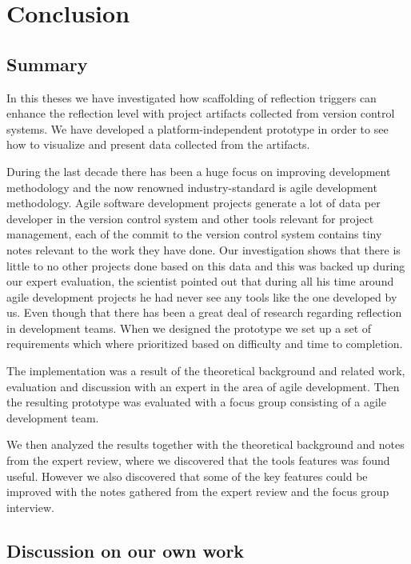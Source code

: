 \chapter{Conclusion}
 
\section{Summary}
In this theses we have investigated how scaffolding of reflection triggers can enhance the reflection level with project artifacts collected from version control systems. We have developed a platform-independent prototype in order to see how to visualize and present data collected from the artifacts.

During the last decade there has been a huge focus on improving development methodology and the now renowned industry-standard is agile development methodology. Agile software development projects generate a lot of data per developer in the version control system and other tools relevant for project management, each of the commit to the version control system contains tiny notes relevant to the work they have done. Our investigation shows that there is little to no other projects done based on this data and this was backed up during our expert evaluation, the scientist pointed out that during all his time around agile development projects he had never see any tools like the one developed by us. Even though that there has been a great deal of research regarding reflection in development teams. When we designed the prototype we set up a set of requirements which where prioritized based on difficulty and time to completion.

The implementation was a result of the theoretical background and related work, evaluation and discussion with an expert in the area of agile development. Then the resulting prototype was evaluated with a focus group consisting of a agile development team.

We then analyzed the results together with the theoretical background and notes from the expert review, where we discovered that the tools features was found useful. However we also discovered that some of the key features could be improved with the notes gathered from the expert review and the focus group interview.

\section{Discussion on our own work}

